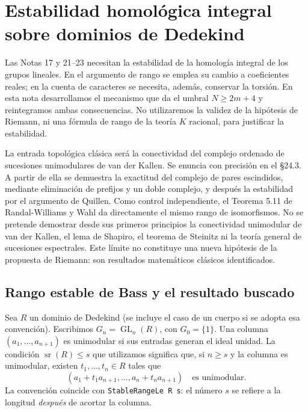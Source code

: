 \section{Estabilidad homológica integral sobre dominios de Dedekind}
\label{sec:estabilidad-integral}

Las Notas 17 y 21--23 necesitan la estabilidad de la homología integral de los grupos lineales. En el argumento de rango se emplea su cambio a coeficientes reales; en la cuenta de caracteres se necesita, además, conservar la torsión. En esta nota desarrollamos el mecanismo que da el umbral $N\ge 2m+4$ y reintegramos ambas consecuencias. No utilizaremos la validez de la hipótesis de Riemann, ni una fórmula de rango de la teoría $K$ racional, para justificar la estabilidad.

La entrada topológica clásica será la conectividad del complejo ordenado de sucesiones unimodulares de van der Kallen. Se enuncia con precisión en el §24.3. A partir de ella se demuestra la exactitud del complejo de pares escindidos, mediante eliminación de prefijos y un doble complejo, y después la estabilidad por el argumento de Quillen. Como control independiente, el Teorema 5.11 de Randal-Williams y Wahl da directamente el mismo rango de isomorfismos. No se pretende demostrar desde sus primeros principios la conectividad unimodular de van der Kallen, el lema de Shapiro, el teorema de Steinitz ni la teoría general de sucesiones espectrales. Este límite no constituye una nueva hipótesis de la propuesta de Riemann: son resultados matemáticos clásicos identificados.

\subsection{Rango estable de Bass y el resultado buscado}

Sea $R$ un dominio de Dedekind (se incluye el caso de un cuerpo si se adopta esa convención). Escribimos $G_n=\operatorname{GL}_n(R)$, con $G_0=\{1\}$. Una columna $(a_1,\ldots,a_{n+1})$ es unimodular si sus entradas generan el ideal unidad. La condición $\operatorname{sr}(R)\le s$ que utilizamos significa que, si $n\ge s$ y la columna es unimodular, existen $t_1,\ldots,t_n\in R$ tales que
\begin{equation}
 (a_1+t_1a_{n+1},\ldots,a_n+t_na_{n+1})\quad\text{es unimodular}.
 \label{eq:ehi-sr}
\end{equation}
La convención coincide con \texttt{StableRangeLe R s}: el número $s$ se refiere a la longitud \emph{después} de acortar la columna.

